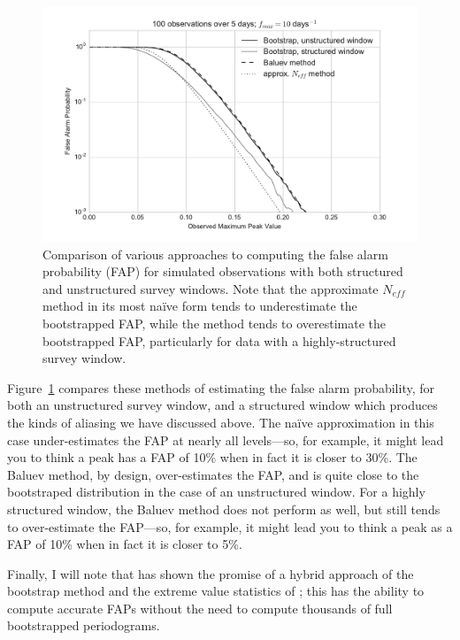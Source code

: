 \documentclass[preprint]{aastex}
\newcommand{\fig}[1]{Figure~\ref{fig:#1}}
\newcommand{\figlabel}[1]{\label{fig:#1}}
\begin{document}
\begin{figure}[ht]
  \centering
  \includegraphics[width=\textwidth]{fig27_FAP_bootstrap}
  \caption{Comparison of various approaches to computing the false alarm
    probability (FAP) for simulated observations with both structured and
    unstructured survey windows. Note that the approximate $N_{eff}$ method
    in its most na{\"i}ve form tends to underestimate the bootstrapped FAP,
    while the \citet{Baluev2008} method tends to overestimate the bootstrapped
    FAP, particularly for data with a highly-structured survey window.
    \figlabel{FAP-bootstrap}}
\end{figure}

\fig{FAP-bootstrap} compares these methods of estimating the false alarm
probability, for both an unstructured survey window, and a structured window
which produces the kinds of aliasing we have discussed above.
The na{\"i}ve approximation in this case under-estimates the FAP at nearly all
levels---so, for example, it might lead you to think a peak has a FAP of 10\%
when in fact it is closer to 30\%.
The Baluev method, by design, over-estimates the FAP, and is quite close to
the bootstraped distribution in the case of an unstructured window.
For a highly structured window, the Baluev method does not perform as well,
but still tends to over-estimate the FAP---so, for example, it might lead you
to think a peak as a FAP of 10\% when in fact it is closer to 5\%.

Finally, I will note that \citet{Suveges12} has shown the promise of a
hybrid approach of the bootstrap method and the extreme value statistics
of \citet{Baluev2008}; this has the ability to compute accurate FAPs
without the need to compute thousands of full bootstrapped periodograms.
\end{document}
